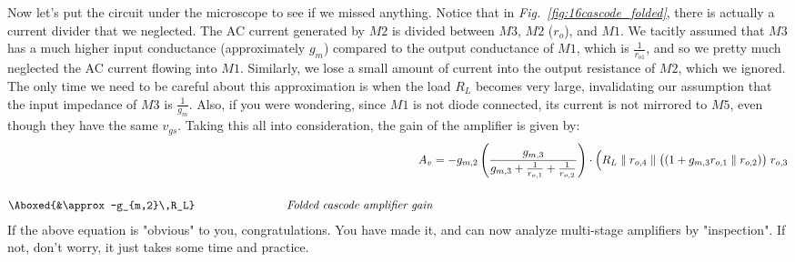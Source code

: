 Now let's put the circuit under the microscope to see if we missed anything.  Notice that in \emph{Fig.~\ref{fig:16cascode_folded}}, there is actually a current divider that we neglected.  The AC current generated by $M2$ is divided between $M3$, $M2$ ($r_o$), and $M1$.  We tacitly assumed that $M3$ has a much higher input conductance (approximately $g_m$) compared to the output conductance of $M1$, which is $\frac{1}{r_{o1}}$, and so we pretty much neglected the AC current flowing into $M1$.  Similarly, we lose a small amount of current into the output resistance of $M2$, which we ignored.  The only time we need to be careful about this approximation is when the load $R_L$ becomes very large, invalidating our assumption that the input impedance of $M3$ is $\frac{1}{g_m}$.  Also, if you were wondering, since $M1$ is not diode connected, its current is not mirrored to $M5$, even though they have the same $v_{gs}$.  Taking this all into consideration, the gain of the amplifier is given by:
    \begin{align}
        A_v &= -g_{m,2}\left(\frac{g_{m,3}}{g_{m,3} + \frac{1}{r_{o,1}} + \frac{1}{r_{o,2}}}\right)
                    \cdot \Big(R_L \parallel r_{o,4} \parallel \big((1 + g_{m,3} r_{o,1} \parallel r_{o,2})\big)\;r_{o,3}\\[0.5cm]
        \Aboxed{&\approx -g_{m,2}\,R_L}
        \text{\qquad\qquad\qquad\qquad}\textit{Folded cascode amplifier gain}
        \label{eq:folded_cascode_gain}
    \end{align} 
If the above equation is "obvious" to you, congratulations.  You have made it, and can now analyze multi-stage amplifiers by "inspection".  If not, don't worry, it just takes some time and practice.


